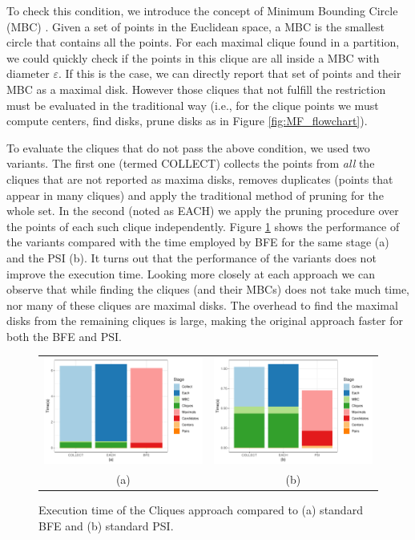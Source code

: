 To check this condition, we introduce the concept of Minimum Bounding Circle (MBC) \cite{welzl_mbc_1991}. Given a set of points in the Euclidean space, a MBC is the smallest circle that contains all the points. For each maximal clique found in a partition, we could quickly check if the points in this clique are all inside a MBC with diameter $\varepsilon$. If this is the case, we can directly report that set of points and their MBC as a maximal disk. However those cliques that not fulfill the restriction must be evaluated in the traditional way (i.e., for the clique points we must compute centers, find disks, prune disks as in Figure \ref{fig:MF_flowchart}).

To evaluate the cliques that do not pass the above condition, we used two variants. The first one (termed COLLECT) collects the points from \textit{all} the cliques that are not reported as maxima disks, removes duplicates (points that appear in many cliques) and apply the traditional method of pruning for the whole set. In the second (noted as EACH) we apply the pruning procedure over the points of each such clique independently. Figure \ref{fig:cmbc_variants} shows the performance of the variants compared with the time employed by BFE for the same stage (a) and the PSI (b).  It turns out that the performance of the variants does not improve the execution time. Looking more closely at each approach we can observe that while finding the cliques (and their MBCs) does not take much time, nor many of these cliques are maximal disks. The overhead to find the maximal disks from the remaining cliques is large, making the original approach faster for both the BFE and PSI.

\begin{figure}
    \centering
    \begin{tabular}{c c}
        \includegraphics[width=0.49\linewidth] {figures/plots/10_cmbc_variants/cmbc_bfe.pdf} &
        \includegraphics[width=0.49\linewidth] {figures/plots/10_cmbc_variants/cmbc_psi.pdf} \\
        (a) & (b) \\
    \end{tabular}
    \caption{Execution time of the Cliques approach compared to (a) standard BFE and (b) standard PSI.}\label{fig:cmbc_variants}
\end{figure}

